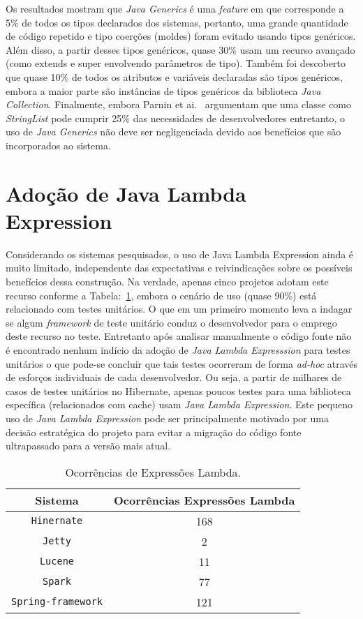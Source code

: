 Os resultados mostram que \textit{Java Generics} é uma \textit{feature} em que corresponde a 5\% de todos os tipos declarados dos sistemas, portanto, uma grande quantidade de código repetido e tipo coerções (moldes) foram evitado usando tipos genéricos. Além disso, a partir desses tipos genéricos, quase 30\% usam um recurso avançado (como extends e super envolvendo parâmetros de tipo). Também foi descoberto que quase 10\% de todos os atributos e variáveis declaradas são tipos genéricos, embora a maior parte são instâncias de tipos genéricos da biblioteca \textit{Java Collection}. Finalmente, embora Parnin et ai.~\cite{Parnin:ACM2011} argumentam que uma classe como \textit{StringList} pode cumprir 25\% das necessidades de desenvolvedores entretanto, o uso de \textit{Java Generics} não deve ser negligenciada devido aos benefícios que são incorporados ao sistema.



\section{Adoção de Java Lambda Expression}
Considerando os sistemas pesquisados, o uso de Java Lambda Expression ainda é muito limitado, independente das expectativas e reivindicações sobre os possíveis benefícios dessa construção. Na verdade, apenas cinco projetos adotam este recurso conforme a Tabela:~\ref{tab:adocaoLambda}, embora o cenário de uso (quase 90\%) está relacionado com testes unitários. O que em um primeiro momento leva a indagar se algum \textit{framework} de teste unitário conduz o desenvolvedor para o emprego deste recurso no teste. Entretanto após analisar manualmente o código fonte não é encontrado nenhum indício da adoção de \textit{Java Lambda Expresssion} para testes unitários o que pode-se concluir que tais testes ocorreram de forma \textit{ad-hoc} através de esforços individuais de cada desenvolvedor.
Ou seja, a partir de milhares de casos de testes unitários no Hibernate, apenas poucos testes para uma biblioteca específica (relacionados com cache) usam \textit{Java Lambda Expression}. Este pequeno uso de \textit{Java Lambda Expression} pode ser principalmente motivado por uma decisão estratégica do projeto para evitar a migração do código fonte ultrapassado para a versão mais atual.

\begin{table}[h]
	\centering
	\caption{Ocorrências de Expressões Lambda.}
	\begin{tabular}{cc}
		\hline
		Sistema & Ocorrências Expressões Lambda\\ 
		\hline \hline
		\texttt{Hinernate} & 168 \\ 
		\texttt{Jetty} & 2 \\ 
		\texttt{Lucene} & 11 \\ 
		\texttt{Spark} & 77 \\ 
		\texttt{Spring-framework} & 121 \\ \hline
	\end{tabular}
	\label{tab:adocaoLambda} %
\end{table}


